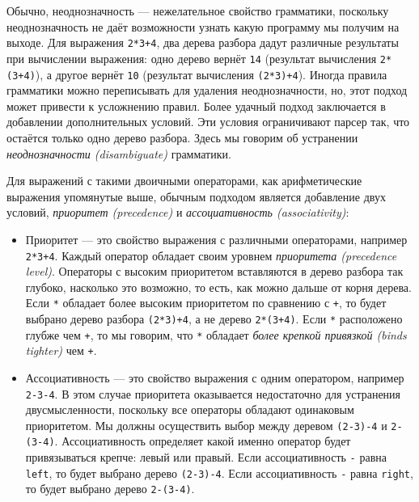 Обычно, неоднозначность --- нежелательное свойство грамматики, поскольку неоднозначность не даёт возможности узнать какую программу мы получим на выходе. Для выражения \lstinline|2*3+4|, два дерева разбора дадут различные результаты при вычислении выражения: одно дерево вернёт \lstinline|14| (результат вычисления \lstinline|2*(3+4)|), а другое вернёт \lstinline|10| (результат вычисления \lstinline|(2*3)+4|). Иногда правила грамматики можно переписывать для удаления неоднозначности, но, этот подход может привести к усложнению правил. Более удачный подход заключается в добавлении дополнительных условий. Эти условия ограничивают парсер так, что остаётся только одно дерево разбора. Здесь мы говорим об устранении \emph{неоднозначности (disambiguate)} грамматики.

Для выражений с такими двоичными операторами, как арифметические выражения упомянутые выше, обычным подходом является добавление двух условий, \emph{приоритет (precedence)} и \emph{ассоциативность ({associativity})}:

\begin{itemize}
\item{Приоритет --- это свойство выражения с различными операторами, например \lstinline|2*3+4|. Каждый оператор обладает своим уровнем \emph{приоритета (precedence level)}. Операторы с высоким приоритетом вставляются в дерево разбора так глубоко, насколько это возможно, то есть, как можно дальше от корня дерева. Если \lstinline|*| обладает более высоким приоритетом по сравнению с \lstinline|+|, то будет выбрано дерево разбора \lstinline|(2*3)+4|, а не дерево \lstinline|2*(3+4)|. Если \lstinline|*| расположено глубже чем \lstinline|+|, то мы говорим, что \lstinline|*| обладает \emph{более крепкой привязкой (binds tighter)} чем \lstinline|+|.}

\item{Ассоциативность --- это свойство выражения с одним оператором, например \lstinline|2-3-4|. В этом случае приоритета оказывается недостаточно для устранения двусмысленности, поскольку все операторы обладают одинаковым приоритетом. Мы должны осуществить выбор между деревом \lstinline|(2-3)-4| и \lstinline|2-(3-4)|. Ассоциативность определяет какой именно оператор будет привязываться крепче: левый или правый. Если ассоциативность \lstinline|-| равна \lstinline|left|, то будет выбрано дерево \lstinline|(2-3)-4|. Если ассоциативность \lstinline|-| равна \lstinline|right|, то будет выбрано дерево \lstinline|2-(3-4)|.}
\end{itemize}

